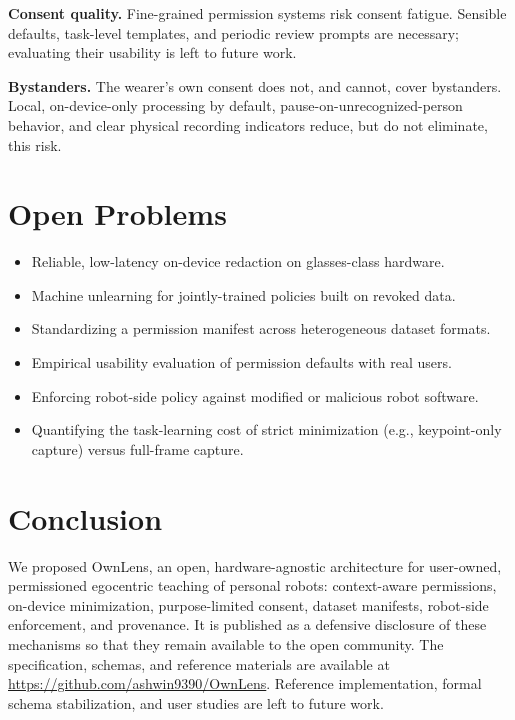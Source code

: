 \documentclass[10pt,twocolumn,letterpaper]{article}
\begin{document}
\textbf{Consent quality.} Fine-grained permission systems risk consent fatigue. Sensible defaults, task-level templates, and periodic review prompts are necessary; evaluating their usability is left to future work.

\textbf{Bystanders.} The wearer's own consent does not, and cannot, cover bystanders. Local, on-device-only processing by default, pause-on-unrecognized-person behavior, and clear physical recording indicators reduce, but do not eliminate, this risk.

\section{Open Problems}

\begin{itemize}
  \item Reliable, low-latency on-device redaction on glasses-class hardware.
  \item Machine unlearning for jointly-trained policies built on revoked data.
  \item Standardizing a permission manifest across heterogeneous dataset formats.
  \item Empirical usability evaluation of permission defaults with real users.
  \item Enforcing robot-side policy against modified or malicious robot software.
  \item Quantifying the task-learning cost of strict minimization (e.g., keypoint-only capture) versus full-frame capture.
\end{itemize}

\section{Conclusion}

We proposed OwnLens, an open, hardware-agnostic architecture for user-owned, permissioned egocentric teaching of personal robots: context-aware permissions, on-device minimization, purpose-limited consent, dataset manifests, robot-side enforcement, and provenance. It is published as a defensive disclosure of these mechanisms so that they remain available to the open community. The specification, schemas, and reference materials are available at \url{https://github.com/ashwin9390/OwnLens}. Reference implementation, formal schema stabilization, and user studies are left to future work.
\end{document}
